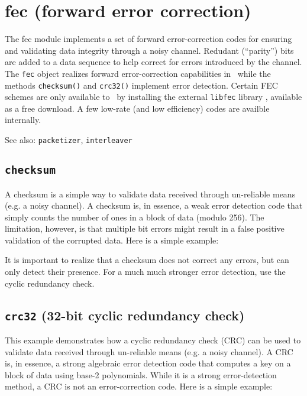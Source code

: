 % 
%

\section{fec (forward error correction)}
\label{module:fec}
The fec module implements a set of forward error-correction codes for
ensuring and validating data integrity through a noisy channel.
Redudant (``parity'') bits are added to a data sequence to help correct for
errors introduced by the channel.
The {\tt fec} object realizes forward error-correction capabilities in
\liquid\ while the methods {\tt checksum()} and {\tt crc32()} implement error
detection.
Certain FEC schemes are only available to \liquid\ by installing the external
{\tt libfec} library \cite{fec:web}, available as a free download.
A few low-rate (and low efficiency) codes are availble internally.

See also: {\tt packetizer}, {\tt interleaver}

\subsection{{\tt checksum}}
\label{module:fec:checksum}
A checksum is a simple way to validate data received through un-reliable means
(e.g. a noisy channel).
A checksum is, in essence, a weak error detection code that simply counts the
number of ones in a block of data (modulo 256).
The limitation, however, is that multiple bit errors might result in a false
positive validation of the corrupted data.
Here is a simple example:
%

%
It is important to realize that a checksum does not correct any errors, but
can only detect their presence.
For a much much stronger error detection, use the cyclic redundancy check.

\subsection{{\tt crc32} (32-bit cyclic redundancy check)}
\label{module:fec:crc32}
This example demonstrates how a cyclic redundancy check (CRC) can be used to
validate data received through un-reliable means (e.g. a noisy channel).
A CRC is, in essence, a strong algebraic error detection code that computes a
key on a block of data using base-2 polynomials.
While it is a strong error-detection method, a CRC is not an error-correction
code.
Here is a simple example:
%


